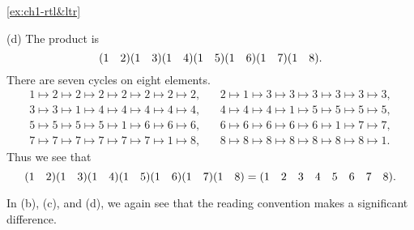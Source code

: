 \begin{solution}{\ref{ex:ch1-rtl&ltr}}
{    (d) The product is
    \[
    (1 \quad 2)(1 \quad 3)(1 \quad 4)(1 \quad 5)(1 \quad 6)(1 \quad 7)(1 \quad 8).
    \]
    There are seven cycles on eight elements.
    \[
    \begin{array}{c}
        1 \mapsto 2 \mapsto 2 \mapsto 2 \mapsto 2 \mapsto 2 \mapsto 2 \mapsto 2, \hspace{20pt}
        2 \mapsto 1 \mapsto 3 \mapsto 3 \mapsto 3 \mapsto 3 \mapsto 3 \mapsto 3,\\
        3 \mapsto 3 \mapsto 1 \mapsto 4 \mapsto 4 \mapsto 4 \mapsto 4 \mapsto 4, \hspace{20pt}
        4 \mapsto 4 \mapsto 4 \mapsto 1 \mapsto 5 \mapsto 5 \mapsto 5 \mapsto 5,\\
        5 \mapsto 5 \mapsto 5 \mapsto 5 \mapsto 1 \mapsto 6 \mapsto 6 \mapsto 6, \hspace{20pt}
        6 \mapsto 6 \mapsto 6 \mapsto 6 \mapsto 6 \mapsto 1 \mapsto 7 \mapsto 7,\\
        7 \mapsto 7 \mapsto 7 \mapsto 7 \mapsto 7 \mapsto 7 \mapsto 1 \mapsto 8, \hspace{20pt}
        8 \mapsto 8 \mapsto 8 \mapsto 8 \mapsto 8 \mapsto 8 \mapsto 8 \mapsto 1.
    \end{array}
    \]
    Thus we see that
    \[
    (1 \quad 2)(1 \quad 3)(1 \quad 4)(1 \quad 5)(1 \quad 6)(1 \quad 7)(1 \quad 8) = (1 \quad 2 \quad 3 \quad 4 \quad 5 \quad 6 \quad 7 \quad 8).
    \]

    In (b), (c), and (d), we again see that the reading convention makes a significant difference.
}\end{solution}

